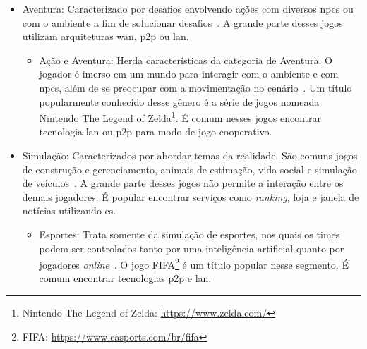 \begin{itemize}
\begin{itemize}
      \item \ac{mmorpg}: Herda características dos gêneros ação e aventura, \ac{rpg}, e \ac{mmo} diretamente. Nesse gênero é permitido interações em um mundo compartilhado aos jogadores, na qual a interação entre outros jogadores (herdado dos jogos \ac{mmo}), com o mundo (herdado dos jogos de ação e aventura) e com objetivos guiados por \acp{npc} (herdados de jogos \ac{rpg}) se faz como desafio e objetivo do jogo~\cite{adams_1208533}. Um título popular para esse gênero é o jogo Blizzard Word of WarCraft, o qual tem o título de maior comunidade de jogo em um único serviço do mundo\footnote{Blizzard Word of WarCraft: \url{https://worldofwarcraft.com/pt-br/}}. A grande parte dos jogos \ac{mmorpg} utilizam tecnologia \ac{wan} e \ac{cs}.
    \end{itemize}
  \item Aventura: Caracterizado por desafios envolvendo ações com diversos \acp{npc} ou com o ambiente a fim de solucionar desafios~\cite{adams_1208533}. A grande parte desses jogos utilizam arquiteturas \ac{wan}, \ac{p2p} ou \ac{lan}.
    \begin{itemize}
      \item Ação e Aventura: Herda características da categoria de Aventura. O jogador é imerso em um mundo para interagir com o ambiente e com \acp{npc}, além de se preocupar com a movimentação no cenário~\cite{adams_1208533}. Um título popularmente conhecido desse gênero é a série de jogos nomeada Nintendo The Legend of Zelda\footnote{Nintendo The Legend of Zelda: \url{https://www.zelda.com/}}. É comum nesses jogos encontrar tecnologia \ac{lan} ou \ac{p2p} para modo de jogo cooperativo.
    \end{itemize}
  \item Simulação: Caracterizados por abordar temas da realidade. São comuns jogos de construção e gerenciamento, animais de estimação, vida social e simulação de veículos~\cite{adams_1208533}. A grande parte desses jogos não permite a interação entre os demais jogadores. É popular encontrar serviços como \textit{ranking}, loja e janela de notícias utilizando \ac{cs}.
    \begin{itemize}
      \item Esportes: Trata somente da simulação de esportes, nos quais os times podem ser controlados tanto por uma inteligência artificial quanto por jogadores \textit{online}~\cite{adams_1208533}. O jogo FIFA\footnote{FIFA: \url{https://www.easports.com/br/fifa}} é um título popular nesse segmento. É comum encontrar tecnologias \ac{p2p} e \ac{lan}.

\end{itemize}
\end{itemize}
